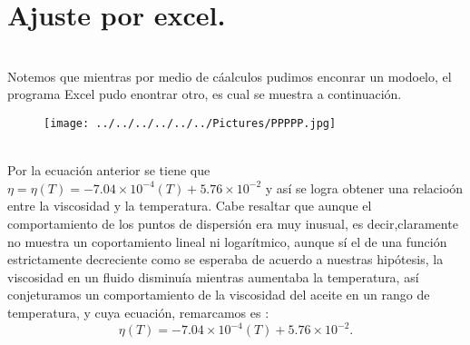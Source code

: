 \documentclass[10pt,a4paper]{article}
\begin{document}
\section*{Ajuste por excel.}\\
Notemos que mientras por medio de c\'{a}alculos pudimos enconrar un modoelo, el programa Excel pudo enontrar otro, es cual se muestra a continuaci\'{o}n.
\\
\begin{figure}[hbtp]
 \centering
\texttt{[image: ../../../../../../Pictures/PPPPP.jpg]} 
\end{figure}
\\
Por la ecuaci\'{o}n anterior se tiene que $\eta= \eta (T) = {-7.04\times 10 }^{ -4 }(T) + 5.76\times { 10 }^{ -2 }$ y as\'{i} se logra obtener una relacio\'{o}n entre la viscosidad y la temperatura. Cabe resaltar que aunque el comportamiento de los puntos de dispersi\'{o}n era muy inusual, es decir,claramente no muestra un coportamiento lineal ni logar\'{i}tmico, aunque s\'{i} el de una funci\'{o}n estrictamente decreciente como se esperaba de acuerdo a nuestras hip\'{o}tesis, la viscosidad en un fluido disminu\'{i}a mientras aumentaba la temperatura, as\'{i} conjeturamos un comportamiento de la viscosidad del aceite en un rango de temperatura, y cuya ecuaci\'{o}n, remarcamos es :
\[ \eta (T) = {-7.04\times 10 }^{ -4 }(T) + 5.76\times { 10 }^{ -2 }. \]
\\
\end{document}
